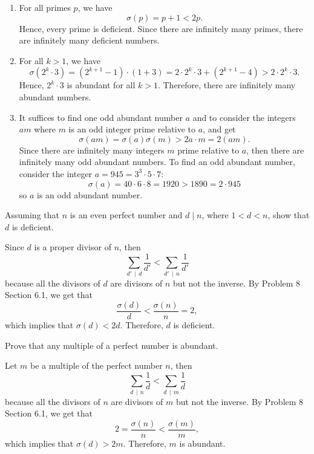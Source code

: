 \begin{solution}
    \begin{enumerate}
        \item For all primes $p$, we have
        $$\sigma(p) = p + 1 < 2p.$$
        Hence, every prime is deficient. Since there are infinitely many primes, there are infinitely many deficient numbers.
        \item For all $k> 1$, we have
        $$\sigma(2^k \cdot 3) = (2^{k+1} - 1)\cdot (1+3) = 2\cdot 2^k \cdot 3 + (2^{k+1} - 4) > 2\cdot 2^k \cdot 3.$$
        Hence, $2^k \cdot 3$ is abundant for all $k > 1$. Therefore, there are infinitely many abundant numbers.
        \item It suffices to find one odd abundant number $a$ and to consider the integers $am$ where $m$ is an odd integer prime relative to $a$, and get
        $$\sigma(am) = \sigma(a)\sigma(m) > 2a \cdot m = 2(am).$$
        Since there are infinitely many integers $m$ prime relative to $a$, then there are infinitely many odd abundant numbers. To find an odd abundant number, consider the integer $a = 945 = 3^3 \cdot 5 \cdot 7$:
        $$\sigma(a) = 40\cdot 6 \cdot 8 = 1920 > 1890 = 2\cdot 945$$
        so $a$ is an odd abundant number. \\
    \end{enumerate}
\end{solution}

\begin{exercise}
    Assuming that $n$ is an even perfect number and $d \mid n$, where $1 < d < n$, show that $d$ is deficient.\\
\end{exercise}

\begin{solution}
    Since $d$ is a proper divisor of $n$, then
    $$\sum_{d' \, \mid \, d}\frac{1}{d'} < \sum_{d' \, \mid \, n}\frac{1}{d'}$$
    because all the divisors of $d$ are divisors of $n$ but not the inverse. By Problem 8 Section 6.1, we get that
    $$\frac{\sigma(d)}{d} < \frac{\sigma(n)}{n} = 2,$$
    which implies that $\sigma(d) < 2d$. Therefore, $d$ is deficient. \\
\end{solution}

\begin{exercise}
    Prove that any multiple of a perfect number is abundant. \\
\end{exercise}

\begin{solution}
    Let $m$ be a multiple of the perfect number $n$, then
    $$\sum_{d \, \mid \, n}\frac{1}{d} < \sum_{d \, \mid \, m}\frac{1}{d}$$
    because all the divisors of $n$ are divisors of $m$ but not the inverse. By Problem 8 Section 6.1, we get that
    $$2 = \frac{\sigma(n)}{n} < \frac{\sigma(m)}{m},$$
    which implies that $\sigma(d) > 2m$. Therefore, $m$ is abundant.  \\
\end{solution}

